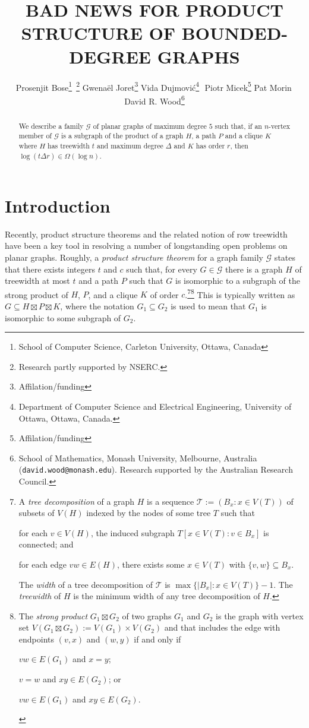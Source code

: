 \documentclass{patmorin}
\title{\MakeUppercase{Bad News for Product Structure of Bounded-Degree Graphs}}
\author{%
  Prosenjit Bose\thanks{School of Computer Science, Carleton University, Ottawa, Canada}\, \thanks{Research partly supported by NSERC.} \quad
  Gwenaël Joret\thanks{Affilation/funding} \quad
  Vida Dujmović\thanks{Department of Computer Science and Electrical Engineering, University of Ottawa, Ottawa, Canada.}\,\, \footnotemark[2] \quad
  Piotr Micek\thanks{Affilation/funding}\quad
  Pat Morin\footnotemark[1]\, \footnotemark[2] \quad
  David R. Wood\thanks{School of Mathematics, Monash University, Melbourne, Australia (\texttt{david.wood@monash.edu}). Research supported by the Australian Research Council.}
}
\date{}
\newcommand{\defin}[1]{\emph{\color{brightmaroon}#1}}
\begin{document}
\maketitle
\renewcommand{\E}{\mathbb{E}}
\renewcommand{\Pr}{\mathbb{P}}

\begin{abstract}
  We describe a family $\mathcal{G}$ of planar graphs of maximum degree $5$ such that, if an $n$-vertex member of $\mathcal{G}$ is a subgraph of the product of a graph $H$, a path $P$ and a clique $K$ where $H$ has treewidth $t$ and maximum degree $\Delta$ and $K$ has order $r$, then $\log(t\Delta r) \in \Omega(\log n)$.
\end{abstract}

\section{Introduction}

Recently, product structure theorems and the related notion of row treewidth have been a key tool in resolving a number of longstanding open problems on planar graphs.  Roughly, a \defin{product structure theorem} for a graph family $\mathcal{G}$ states that there exists integers $t$ and $c$ such that, for every $G\in\mathcal{G}$ there is a graph $H$ of treewidth at most $t$ and a path $P$ such that $G$ is isomorphic to a subgraph of the strong product of $H$, $P$, and a clique $K$ of order $c$.\footnote{A \defin{tree decomposition} of a graph $H$ is a sequence $\mathcal{T}:=(B_x:x\in V(T))$ of subsets of $V(H)$ indexed by the nodes of some tree $T$ such that
\begin{inparaenum}[(i)]
  \item for each $v\in V(H)$, the induced subgraph $T[x\in V(T):v\in B_x]$ is connected; and
  \item for each edge $vw\in E(H)$, there exists some $x\in V(T)$ with $\{v,w\}\subseteq B_x$.
\end{inparaenum}
The \defin{width} of a tree decomposition of $\mathcal{T}$ is $\max\{|B_x|:x\in V(T)\}-1$. The \defin{treewidth} of $H$ is the minimum width of any tree decomposition of $H$.}\footnote{The \defin{strong product} $G_1\boxtimes G_2$ of two graphs $G_1$ and $G_2$ is the graph with vertex set $V(G_1\boxtimes G_2):=V(G_1)\times V(G_2)$ and that includes the edge with endpoints $(v,x)$ and $(w,y)$ if and only if
\begin{inparaenum}[(i)]
  \item $vw\in E(G_1)$ and $x=y$;
  \item $v=w$ and $xy\in E(G_2)$; or
  \item $vw\in E(G_1)$ and $xy\in E(G_2)$.
\end{inparaenum}
}
This is typically written as $G\subseteq H\boxtimes P\boxtimes K$, where the notation $G_1\subseteq G_2$ is used to mean that $G_1$ is isomorphic to some subgraph of $G_2$.
\end{document}
